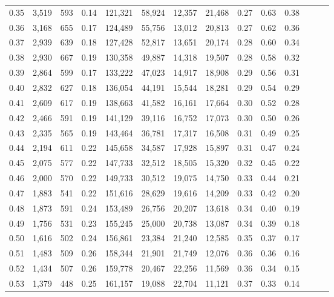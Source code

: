 \begin{tabular}{rrrrrrrrrrrrrr}
0.35 &  3,519 &  593 &  0.14 &  121,321 &   58,924 &  12,357 &  21,468 &  0.27 &  0.63 &      0.38 \\
0.36 &  3,168 &  655 &  0.17 &  124,489 &   55,756 &  13,012 &  20,813 &  0.27 &  0.62 &      0.36 \\
0.37 &  2,939 &  639 &  0.18 &  127,428 &   52,817 &  13,651 &  20,174 &  0.28 &  0.60 &      0.34 \\
0.38 &  2,930 &  667 &  0.19 &  130,358 &   49,887 &  14,318 &  19,507 &  0.28 &  0.58 &      0.32 \\
0.39 &  2,864 &  599 &  0.17 &  133,222 &   47,023 &  14,917 &  18,908 &  0.29 &  0.56 &      0.31 \\
0.40 &  2,832 &  627 &  0.18 &  136,054 &   44,191 &  15,544 &  18,281 &  0.29 &  0.54 &      0.29 \\
0.41 &  2,609 &  617 &  0.19 &  138,663 &   41,582 &  16,161 &  17,664 &  0.30 &  0.52 &      0.28 \\
0.42 &  2,466 &  591 &  0.19 &  141,129 &   39,116 &  16,752 &  17,073 &  0.30 &  0.50 &      0.26 \\
0.43 &  2,335 &  565 &  0.19 &  143,464 &   36,781 &  17,317 &  16,508 &  0.31 &  0.49 &      0.25 \\
0.44 &  2,194 &  611 &  0.22 &  145,658 &   34,587 &  17,928 &  15,897 &  0.31 &  0.47 &      0.24 \\
0.45 &  2,075 &  577 &  0.22 &  147,733 &   32,512 &  18,505 &  15,320 &  0.32 &  0.45 &      0.22 \\
0.46 &  2,000 &  570 &  0.22 &  149,733 &   30,512 &  19,075 &  14,750 &  0.33 &  0.44 &      0.21 \\
0.47 &  1,883 &  541 &  0.22 &  151,616 &   28,629 &  19,616 &  14,209 &  0.33 &  0.42 &      0.20 \\
0.48 &  1,873 &  591 &  0.24 &  153,489 &   26,756 &  20,207 &  13,618 &  0.34 &  0.40 &      0.19 \\
0.49 &  1,756 &  531 &  0.23 &  155,245 &   25,000 &  20,738 &  13,087 &  0.34 &  0.39 &      0.18 \\
0.50 &  1,616 &  502 &  0.24 &  156,861 &   23,384 &  21,240 &  12,585 &  0.35 &  0.37 &      0.17 \\
0.51 &  1,483 &  509 &  0.26 &  158,344 &   21,901 &  21,749 &  12,076 &  0.36 &  0.36 &      0.16 \\
0.52 &  1,434 &  507 &  0.26 &  159,778 &   20,467 &  22,256 &  11,569 &  0.36 &  0.34 &      0.15 \\
0.53 &  1,379 &  448 &  0.25 &  161,157 &   19,088 &  22,704 &  11,121 &  0.37 &  0.33 &      0.14 \\

\end{tabular}
